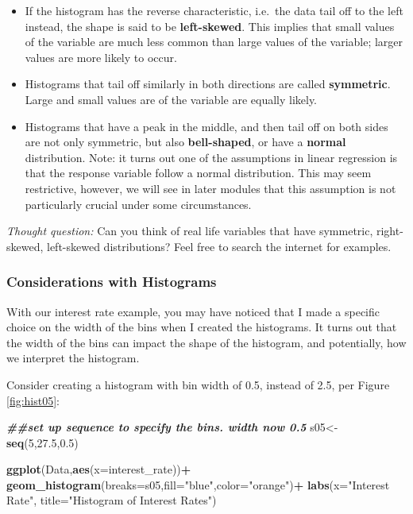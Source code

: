 \documentclass[
]{book}
\newenvironment{Shaded}{\begin{snugshade}}{\end{snugshade}}
\newcommand{\AttributeTok}[1]{\textcolor[rgb]{0.13,0.29,0.53}{#1}}
\newcommand{\DecValTok}[1]{\textcolor[rgb]{0.00,0.00,0.81}{#1}}
\newcommand{\DocumentationTok}[1]{\textcolor[rgb]{0.56,0.35,0.01}{\textbf{\textit{#1}}}}
\newcommand{\FloatTok}[1]{\textcolor[rgb]{0.00,0.00,0.81}{#1}}
\newcommand{\FunctionTok}[1]{\textcolor[rgb]{0.13,0.29,0.53}{\textbf{#1}}}
\newcommand{\NormalTok}[1]{#1}
\newcommand{\OtherTok}[1]{\textcolor[rgb]{0.56,0.35,0.01}{#1}}
\newcommand{\SpecialCharTok}[1]{\textcolor[rgb]{0.81,0.36,0.00}{\textbf{#1}}}
\newcommand{\StringTok}[1]{\textcolor[rgb]{0.31,0.60,0.02}{#1}}
\begin{document}
\begin{itemize}
\item
  If the histogram has the reverse characteristic, i.e.~the data tail off to the left instead, the shape is said to be \textbf{left-skewed}. This implies that small values of the variable are much less common than large values of the variable; larger values are more likely to occur.
\item
  Histograms that tail off similarly in both directions are called \textbf{symmetric}. Large and small values are of the variable are equally likely.
\item
  Histograms that have a peak in the middle, and then tail off on both sides are not only symmetric, but also \textbf{bell-shaped}, or have a \textbf{normal} distribution. Note: it turns out one of the assumptions in linear regression is that the response variable follow a normal distribution. This may seem restrictive, however, we will see in later modules that this assumption is not particularly crucial under some circumstances.
\end{itemize}

\emph{Thought question:} Can you think of real life variables that have symmetric, right-skewed, left-skewed distributions? Feel free to search the internet for examples.

\hypertarget{considerations-with-histograms}{%
\subsubsection{Considerations with Histograms}\label{considerations-with-histograms}}

With our interest rate example, you may have noticed that I made a specific choice on the width of the bins when I created the histograms. It turns out that the width of the bins can impact the shape of the histogram, and potentially, how we interpret the histogram.

Consider creating a histogram with bin width of 0.5, instead of 2.5, per Figure \ref{fig:hist05}:

\begin{Shaded}
\begin{Highlighting}[]
\DocumentationTok{\#\#set up sequence to specify the bins. width now 0.5}
\NormalTok{s05}\OtherTok{\textless{}{-}}\FunctionTok{seq}\NormalTok{(}\DecValTok{5}\NormalTok{,}\FloatTok{27.5}\NormalTok{,}\FloatTok{0.5}\NormalTok{)}

\FunctionTok{ggplot}\NormalTok{(Data,}\FunctionTok{aes}\NormalTok{(}\AttributeTok{x=}\NormalTok{interest\_rate))}\SpecialCharTok{+}
  \FunctionTok{geom\_histogram}\NormalTok{(}\AttributeTok{breaks=}\NormalTok{s05,}\AttributeTok{fill=}\StringTok{"blue"}\NormalTok{,}\AttributeTok{color=}\StringTok{"orange"}\NormalTok{)}\SpecialCharTok{+}
  \FunctionTok{labs}\NormalTok{(}\AttributeTok{x=}\StringTok{"Interest Rate"}\NormalTok{, }\AttributeTok{title=}\StringTok{"Histogram of Interest Rates"}\NormalTok{)}
\end{Highlighting}
\end{Shaded}
\end{document}
